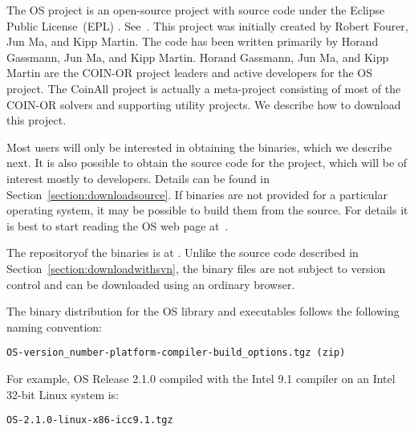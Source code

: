 \label{section:obtainingbinaries}

\ifdevelop
The OS project is an open-source project  with source code under the Eclipse Public License~(EPL)%
.
See~{\tt\UrlEpl}.  This project was initially created by Robert Fourer, Jun Ma, and Kipp Martin.
The code has been written primarily by  Horand Gassmann,   Jun Ma,  and Kipp Martin.    
Horand Gassmann,  Jun Ma,  and Kipp Martin are the COIN-OR project leaders and active developers for the OS project.
\else
The CoinAll project is actually a meta-project consisting of most of the COIN-OR solvers and supporting utility projects.  We describe how to download this project. 
\fi

Most users will only be interested in obtaining the binaries, which we describe  next.
It is also possible to obtain the source code for the project, which will be of interest mostly to developers. 
\ifdevelop
Details can be found in  Section~\ref{section:downloadsource}.
\else
If binaries are not provided for a particular operating system, it may be possible to build them from the source.
For details it is best to start reading the OS web page at~{\tt\UrlOsWiki}.
\fi



The repositoryof the binaries is at {\tt\UrlOsBinaries}.
%
\ifdevelop
 Unlike the source code described in Section~\ref{section:downloadwithsvn}, the binary files 
are not subject to version control and can be downloaded using an ordinary browser. 
\fi

The binary distribution for the OS library and executables follows the following naming convention:


\begin{verbatim}
OS-version_number-platform-compiler-build_options.tgz (zip)
\end{verbatim}
For example, OS  Release 2.1.0 compiled with the Intel 9.1 compiler on an Intel 32-bit Linux system is:
\begin{verbatim}
OS-2.1.0-linux-x86-icc9.1.tgz
\end{verbatim}

